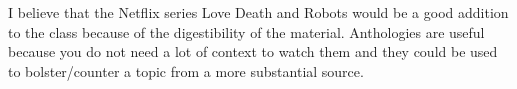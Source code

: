 I believe that the Netflix series Love Death and Robots would be a good addition to the class because of the digestibility of the material.
Anthologies are useful because you do not need a lot of context to watch them and they could be used to bolster/counter a topic from a more substantial source.
